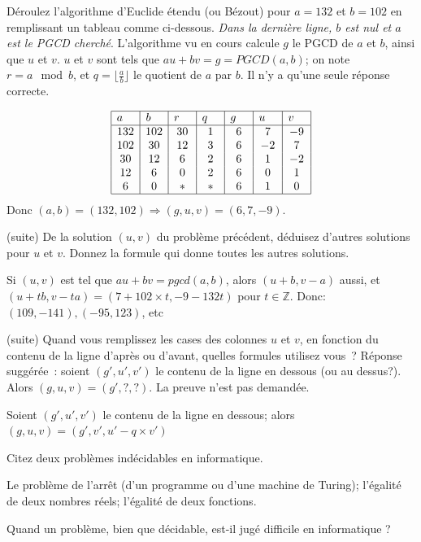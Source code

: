\documentclass[11pt]{article}
\def\Z{\mathbb Z}
\begin{document}
 {D\'eroulez l'algorithme d'Euclide \'etendu (ou Bézout) pour $a=132$ et $b=102$ en remplissant un tableau comme ci-dessous. {\it Dans la dernière ligne, $b$ est nul et $a$ est le PGCD cherché}.
L'algorithme vu en cours calcule $g$ le PGCD de $a$ et $b$, ainsi que $u$ et $v$. $u$ et $v$ sont tels que $au+bv=g=PGCD(a,b)$; on note $r=a \mod b$, et $q=\lfloor \frac{a}{b}\rfloor$
le quotient de $a$ par $b$.   Il n'y a qu'une seule réponse correcte.
\medskip


{\large
$$
\begin{array}{|c|c|c|c|c|c|c|}
\hline
a\quad & b \quad& r \quad& q \quad& g \quad& u \quad& v \quad\\
\hline
132 & 102 & 30 & 1 & 6 & 7 & -9 \\
102 & 30  & 12 & 3 & 6 & -2 & 7 \\
30 &  12  & 6  & 2 & 6 & 1 & -2 \\
12 &  6   & 0  & 2 & 6 & 0 & 1 \\
6 &  0   & *  & * &  6 & 1 & 0 \\
\hline
\end{array}$$
}
Donc $(a,b)=(132,102) \Rightarrow (g,u,v)=(6,7,-9)$.

 (suite) De la solution $(u, v)$ du problème précédent, déduisez d'autres solutions pour $u$ et $v$.
Donnez la formule qui donne toutes les autres solutions.

\medskip

Si $(u,v)$ est tel que $au+bv=pgcd(a,b)$, alors $(u+b,v-a)$ aussi, et
$(u+tb, v-ta)=(7+102\times t, -9 - 132 t)$ pour $t\in \Z$. Donc: $(109, -141),
(-95, 123)$, etc 
~

 (suite) Quand vous remplissez les cases des colonnes $u$ et $v$, en fonction du contenu de la ligne d'après ou d'avant, quelles formules utilisez vous~?
Réponse suggérée~: soient $(g', u', v')$ le contenu de la ligne en dessous (ou au dessus?).
Alors $(g,u,v)=(g',?,?)$. La preuve n'est pas demandée.


\medskip

Soient $(g', u', v')$ le contenu de la ligne en dessous; alors $(g, u, v)=(g', v', u'-q\times v')$

 Citez deux problèmes indécidables en informatique.

\medskip

Le problème de l'arrêt (d'un programme ou d'une machine de Turing); l'égalité de deux nombres réels; l'égalité de deux fonctions.


 Quand un problème, bien que décidable, est-il jugé difficile en informatique ?


}
\end{document}
